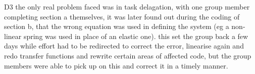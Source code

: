 D3 the only real problem faced was in task delagation, with one group member completing 
section a themselves, it was later found out during the coding of section b, that the 
wrong equation was used in defining the system (eg a non-linear spring was used in place
of an elastic one). this set the group back a few days while effort had to be redirected
to correct the error, linearise again and redo transfer functions and rewrite certain
areas of affected code, but the group members were able to pick up on this and correct 
it in a timely manner.